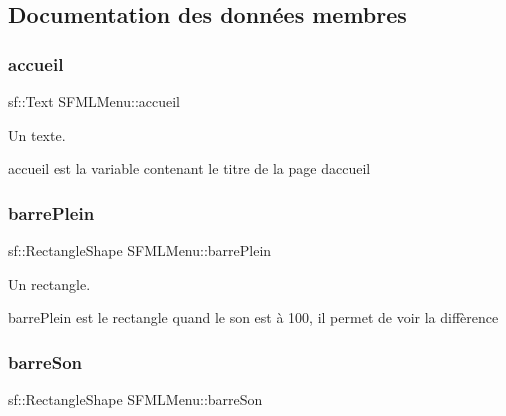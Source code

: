 \subsection{Documentation des données membres}
\mbox{\label{class_s_f_m_l_menu_ade3be9d73dc5eadcf78f93bd736637b3}} 
\subsubsection{\texorpdfstring{accueil}{accueil}}
{\footnotesize\ttfamily sf\+::\+Text S\+F\+M\+L\+Menu\+::accueil\hspace{0.3cm}{\ttfamily [private]}}



Un texte. 

accueil est la variable contenant le titre de la page d\textquotesingle{}accueil \mbox{\label{class_s_f_m_l_menu_a04eaa093a1ac60b8d6d3c11f269675ab}} 
\subsubsection{\texorpdfstring{barre\+Plein}{barrePlein}}
{\footnotesize\ttfamily sf\+::\+Rectangle\+Shape S\+F\+M\+L\+Menu\+::barre\+Plein\hspace{0.3cm}{\ttfamily [private]}}



Un rectangle. 

barre\+Plein est le rectangle quand le son est à 100, il permet de voir la diffèrence \mbox{\label{class_s_f_m_l_menu_a82556c1a0294f342bf4400774148d29b}} 
\subsubsection{\texorpdfstring{barre\+Son}{barreSon}}
{\footnotesize\ttfamily sf\+::\+Rectangle\+Shape S\+F\+M\+L\+Menu\+::barre\+Son\hspace{0.3cm}{\ttfamily [private]}}



